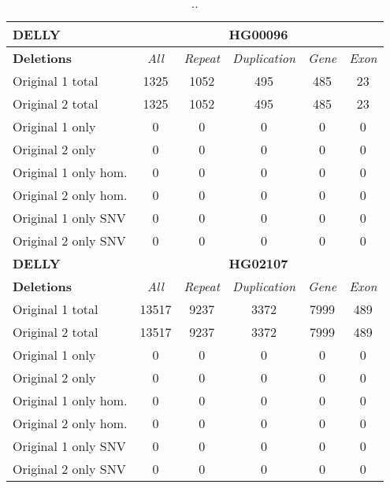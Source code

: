 \begin{table}[htb]
\begin{center}
\begin{tabular}{|l|c||c|c|c|c|}
\hline
{\bf DELLY} & \multicolumn{5}{|c|}{\bf HG00096} \\
\hline
\cline{2-6}
{\bf Deletions} & {\it All} & {\it Repeat} & {\it Duplication} & {\it Gene} & {\it Exon} \\
\hline
Original 1 total & 1325 & 1052 & 495 & 485 & 23\\ 
\hline
Original 2 total & 1325 & 1052 & 495 & 485 & 23\\ 
\hline
Original 1 only & 0 & 0 & 0 & 0 & 0\\ 
\hline
Original 2 only & 0 & 0 & 0 & 0 & 0\\ 
\hline
Original 1 only hom. & 0 & 0 & 0 & 0 & 0\\ 
\hline
Original 2 only hom. & 0 & 0 & 0 & 0 & 0\\ 
\hline
Original 1 only SNV & 0 & 0 & 0 & 0 & 0\\ 
\hline
Original 2 only SNV & 0 & 0 & 0 & 0 & 0\\ 
\hline
\hline
{\bf DELLY} & \multicolumn{5}{|c|}{\bf HG02107} \\
\hline
\cline{2-6}
{\bf Deletions} & {\it All} & {\it Repeat} & {\it Duplication} & {\it Gene} & {\it Exon} \\
\hline
Original 1 total & 13517 & 9237 & 3372 & 7999 & 489\\ 
\hline
Original 2 total & 13517 & 9237 & 3372 & 7999 & 489\\ 
\hline
Original 1 only & 0 & 0 & 0 & 0 & 0\\ 
\hline
Original 2 only & 0 & 0 & 0 & 0 & 0\\ 
\hline
Original 1 only hom. & 0 & 0 & 0 & 0 & 0\\ 
\hline
Original 2 only hom. & 0 & 0 & 0 & 0 & 0\\ 
\hline
Original 1 only SNV & 0 & 0 & 0 & 0 & 0\\ 
\hline
Original 2 only SNV & 0 & 0 & 0 & 0 & 0\\ 
\hline
\end{tabular}
\end{center}
\caption{ .. }
\label{tab:orig-vs-orig2-delly-deletions}
\end{table}

